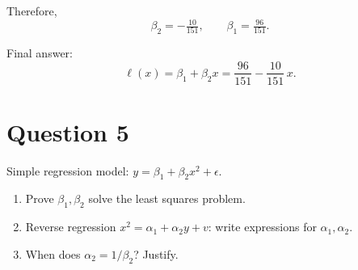 \documentclass[12pt,a4paper]{article}
\begin{document}
Therefore,
\[
\beta_2=-\tfrac{10}{151},\qquad
\beta_1=\tfrac{96}{151}.
\]

Final answer:
\[
\ell(x)=\beta_1+\beta_2 x
=\frac{96}{151}-\frac{10}{151}\,x.
\]

\section*{Question 5}
Simple regression model: $y = \beta_1 + \beta_2 x^2 + \epsilon$.

\begin{enumerate}[label=(\alph*)]
  \item Prove $\beta_1,\beta_2$ solve the least squares problem.  
  \item Reverse regression $x^2 = \alpha_1 + \alpha_2 y + v$: write expressions for $\alpha_1,\alpha_2$.  
  \item When does $\alpha_2 = 1/\beta_2$? Justify.
\end{enumerate}
\end{document}

